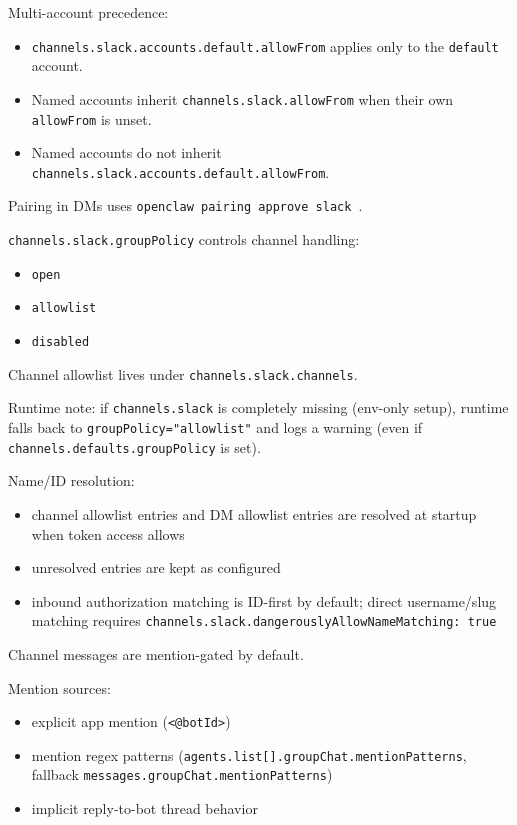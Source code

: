 Multi-account precedence:

\begin{itemize}
  \item \texttt{channels.slack.accounts.default.allowFrom} applies only to the \texttt{default} account.
  \item Named accounts inherit \texttt{channels.slack.allowFrom} when their own \texttt{allowFrom} is unset.
  \item Named accounts do not inherit \texttt{channels.slack.accounts.default.allowFrom}.
\end{itemize}


Pairing in DMs uses \texttt{openclaw pairing approve slack }.


\texttt{channels.slack.groupPolicy} controls channel handling:

\begin{itemize}
  \item \texttt{open}
  \item \texttt{allowlist}
  \item \texttt{disabled}
\end{itemize}


Channel allowlist lives under \texttt{channels.slack.channels}.

Runtime note: if \texttt{channels.slack} is completely missing (env-only setup), runtime falls back to \texttt{groupPolicy="allowlist"} and logs a warning (even if \texttt{channels.defaults.groupPolicy} is set).

Name/ID resolution:

\begin{itemize}
  \item channel allowlist entries and DM allowlist entries are resolved at startup when token access allows
  \item unresolved entries are kept as configured
  \item inbound authorization matching is ID-first by default; direct username/slug matching requires \texttt{channels.slack.dangerouslyAllowNameMatching: true}
\end{itemize}



Channel messages are mention-gated by default.

Mention sources:

\begin{itemize}
  \item explicit app mention (\texttt{<@botId>})
  \item mention regex patterns (\texttt{agents.list[].groupChat.mentionPatterns}, fallback \texttt{messages.groupChat.mentionPatterns})
  \item implicit reply-to-bot thread behavior
\end{itemize}


